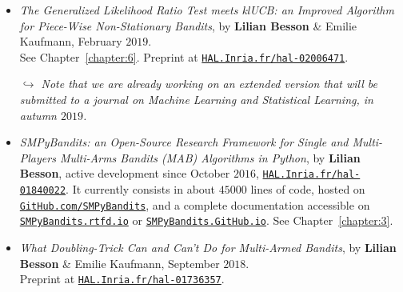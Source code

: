 \begin{itemize}

\item
    \emph{The Generalized Likelihood Ratio Test meets klUCB: an Improved Algorithm for Piece-Wise Non-Stationary Bandits},
    by \textbf{Lilian Besson} \& Emilie Kaufmann,
    February $2019$.\\
    See Chapter~\ref{chapter:6}.
    Preprint at \href{https://HAL.Inria.fr/hal-02006471}{\texttt{HAL.Inria.fr/hal-02006471}}.
    \cite{Besson2019GLRT}

    \emph{$\hookrightarrow$ Note that we are already working on an extended version that will be submitted to a journal on Machine Learning and Statistical Learning, in autumn $2019$.}

\item
    \emph{SMPyBandits: an Open-Source Research Framework for Single and Multi-Players Multi-Arms Bandits (MAB) Algorithms in Python},
    by \textbf{Lilian Besson}, active development since October $2016$,
    \href{https://HAL.Inria.fr/hal-01840022}{\texttt{HAL.Inria.fr/hal-01840022}}.
    It currently consists in about $45000$ lines of code, hosted on \href{https://GitHub.com/SMPyBandits}{\texttt{GitHub.com/SMPyBandits}},
    and a complete documentation accessible on \href{https://SMPyBandits.rtfd.io}{\texttt{SMPyBandits.rtfd.io}} or \href{https://SMPyBandits.GitHub.io}{\texttt{SMPyBandits.GitHub.io}}.
    See Chapter~\ref{chapter:3}.
    \cite{SMPyBanditsJMLR,SMPyBandits}

\item
    \emph{What Doubling-Trick Can and Can't Do for Multi-Armed Bandits},
    by \textbf{Lilian Besson} \& Emilie Kaufmann,
    September $2018$.\\
    Preprint at \href{https://HAL.Inria.fr/hal-01736357}{\texttt{HAL.Inria.fr/hal-01736357}}.
    \cite{Besson2018DoublingTricks}

\end{itemize}




